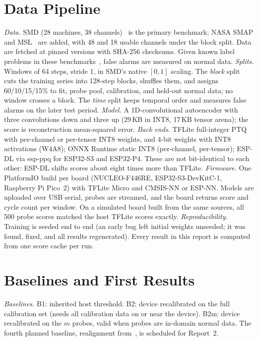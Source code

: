 \documentclass[conference]{IEEEtran}
\begin{document}
\section{Data Pipeline}
\emph{Data.} SMD (28 machines, 38 channels)~\cite{su2019} is the primary benchmark; NASA SMAP and MSL~\cite{hundman2018} are added, with 48 and 18 usable channels under the block split. Data are fetched at pinned versions with SHA-256 checksums. Given known label problems in these benchmarks~\cite{wu2023}, false alarms are measured on normal data.
\emph{Splits.} Windows of 64 steps, stride 1, in SMD's native $[0,1]$ scaling. The \emph{block} split cuts the training series into 128-step blocks, shuffles them, and assigns 60/10/15/15\% to fit, probe pool, calibration, and held-out normal data; no window crosses a block. The \emph{time} split keeps temporal order and measures false alarms on the later test period.
\emph{Model.} A 1D-convolutional autoencoder with three convolutions down and three up (29\,KB in INT8, 17\,KB tensor arena); the score is reconstruction mean-squared error.
\emph{Back ends.} TFLite full-integer PTQ with per-channel or per-tensor INT8 weights, and 4-bit weights with INT8 activations (W4A8); ONNX Runtime static INT8 (per-channel, per-tensor); ESP-DL via esp-ppq for ESP32-S3 and ESP32-P4. These are not bit-identical to each other: ESP-DL shifts scores about eight times more than TFLite.
\emph{Firmware.} One PlatformIO build per board (NUCLEO-F446RE, ESP32-S3-DevKitC-1, Raspberry Pi Pico~2) with TFLite Micro and CMSIS-NN or ESP-NN. Models are uploaded over USB serial, probes are streamed, and the board returns score and cycle count per window. On a simulated board built from the same sources, all 500 probe scores matched the host TFLite scores exactly.
\emph{Reproducibility.} Training is seeded end to end (an early bug left initial weights unseeded; it was found, fixed, and all results regenerated). Every result in this report is computed from one score cache per run.

\section{Baselines and First Results}
\emph{Baselines.} B1: inherited host threshold. B2: device recalibrated on the full calibration set (needs all calibration data on or near the device). B2m: device recalibrated on the $m$ probes, valid when probes are in-domain normal data. The fourth planned baseline, realignment from~\cite{bysani2026}, is scheduled for Report~2.
\end{document}
